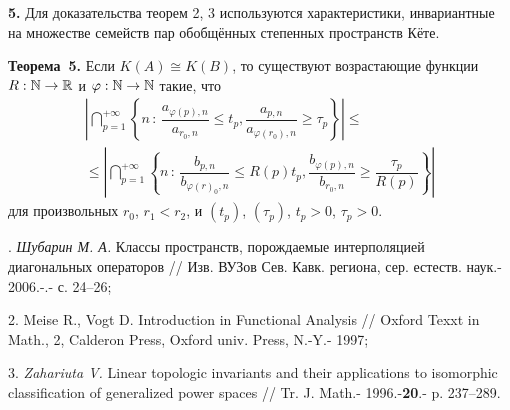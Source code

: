 {\bf 5. } Для доказательства теорем 2, 3 используются
характеристики, инвариантные на множестве семейств пар обобщённых степенных пространств Кёте.

\noindent\textbf{Теорема~5.}
Если $K(A)\cong K(B)$, то существуют возрастающие функции $R:{\Bbb N}\to {\Bbb R}$ и $\varphi : {\Bbb N}\to {\Bbb N}$
такие, что
\begin{eqnarray*}
\left|\bigcap\limits_{p=1}^{+\infty }
\left\{
n\,:\,\dfrac{a_{\varphi(p),n}}{a_{r_0,n}}\leqslant t_p,
\dfrac{a_{p,n}}{a_{\varphi(r_0),n}}\geqslant \tau_p
\right\}\right|
\leqslant \\ \leqslant\left|\bigcap\limits_{p=1}^{+\infty }
\left\{
n\,:\,\dfrac{b_{p,n}}{b_{\varphi(r)_0,n}}\leqslant R(p)t_p,
\dfrac{b_{\varphi(p),n}}{b_{r_0,n}}\geqslant \dfrac{\tau_p}{R(p)}
\right\}\right|
\end{eqnarray*}
для произвольных $r_0$, $r_1<r_2$,  и $(t_p)$, $(\tau _p)$, $t_p>0$, $\tau _p>0$.

. {\it Шубарин М. А.} Классы пространств, порождаемые интерполяцией
диагональных операторов // Изв. ВУЗов Сев. Кавк. региона, сер. естеств. наук.- 2006.-.- с. 24--26;

2. {Meise R., Vogt D.} Introduction in Functional Analysis // Oxford Texxt in Math., 2,
Calderon  Press, Oxford univ. Press, N.-Y.- 1997;

3. {\it Zahariuta V.} Linear topologic invariants and their appli\-cations
to isomorphic classification of generalized power spaces // Tr. J. Math.- 1996.-{\bf 20}.- p. 237--289.
